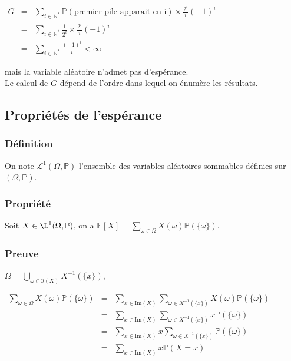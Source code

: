 \documentclass[a4paper,10pt]{book} %
\newcommand{\N}{\mathbb{N}}
\newcommand{\E}{\mathbb{E}} %
\renewcommand{\P}{\mathbb{P}} %
\newcommand{\Ima}{\mathrm{Im}} %
\begin{document}
$\begin{array}{rcl}G&=&\displaystyle \sum_{i\in \N^*}\P(\text{premier pile apparait en i})\times \frac{2^i}{i}(-1)^i\\
&=&\displaystyle \sum_{i\in \N^*}\frac{1}{2^i}\times \frac{2^i}{i}(-1)^i\\
&=&\displaystyle \sum_{i\in\N^*}\frac{(-1)^i}{i}<\infty\end{array}$

mais la variable aléatoire n'admet pas d'espérance.\\

Le calcul de $G$ dépend de l'ordre dans lequel on énumère les résultats.

\subsection{Propriétés de l'espérance}
\subsubsection{Définition}
On note $\mathcal{L}^1(\Omega,\P)$ l'ensemble des variables aléatoires sommables définies sur $(\Omega,\P)$.

\subsubsection{Propriété}
Soit $X\in \L^1(\Omega,\P)$, on a $\E[X]=\sum_{\omega\in \Omega}X(\omega)\P(\{\omega\})$.

\subsubsection{Preuve}
$\displaystyle \Omega=\bigcup_{\omega\in\Im(X)}X^{-1}(\{x\})$,

$\begin{array}{rcl}\displaystyle \sum_{\omega\in \Omega}X(\omega)\P(\{\omega\})&=&\displaystyle \sum_{x\in \Ima(X)}\sum_{\omega\in X^{-1}(\{x\})}X(\omega)\P(\{\omega\})\\
&=&\displaystyle \sum_{x\in \Ima(X)}\sum_{\omega\in X^{-1}(\{x\})}x\P(\{\omega\})\\
&=&\displaystyle \sum_{x\in \Ima(X)}x\sum_{\omega\in X^{-1}(\{x\})}\P(\{\omega\})\\
&=&\displaystyle \sum_{x\in \Ima(X)}x\P(X=x)\end{array}$
\end{document}
